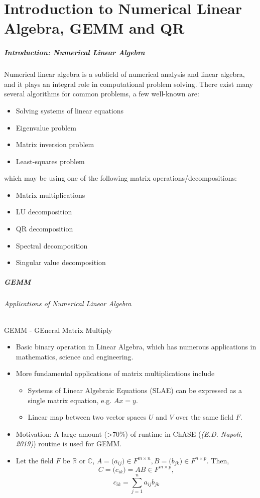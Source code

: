 \part{Introduction to Numerical Linear Algebra, GEMM and QR}
\makepart

\begin{frame}
\frametitle{Introduction: Numerical Linear Algebra}
Numerical linear algebra is a subfield of numerical analysis and linear algebra,
and it plays an integral role in computational problem solving.
There exist many several algorithms for common problems, a few well-known are:
\begin{itemize}
 \item Solving systems of linear equations
 \item Eigenvalue problem
 \item Matrix inversion problem
 \item Least-squares problem
\end{itemize}
which may be using one of the following matrix operations/decompositions:
\begin{itemize}
 \item Matrix multiplications
 \item LU decomposition
 \item QR decomposition
 \item Spectral decomposition
 \item Singular value decomposition
\end{itemize}
\end{frame}

\begin{frame}
\frametitle{GEMM}
\framesubtitle{Applications of Numerical Linear Algebra}
GEMM - GEneral Matrix Multiply
\begin{itemize}
 \item Basic binary operation in Linear Algebra, which has numerous applications in mathematics, science and engineering.
 \item More fundamental applications of matrix multiplications include
  \begin{itemize}
   \item Systems of Linear Algebraic Equations (SLAE) can be expressed as a single matrix equation, e.g. \(Ax = y\). 
   \item Linear map between two vector spaces \(U\) and \(V\) over the same field \(F\).
  \end{itemize}
 \item Motivation: A large amount (>70\%) of runtime in ChASE (\emph{(E.D. Napoli, 2019)}) routine is used for GEMM.
 \item Let the field \(F\) be \(\mathbb{R}\) or \(\mathbb{C}\), \(A =\big( a_{ij} \big) \in F^{m \times n}, B =\big( b_{jk} \big) \in F^{n \times p}\). Then,
 \begin{equation}
  C=\big( c_{ik} \big)=AB \in F^{m \times p},
 \end{equation}
 \begin{equation}
  c_{ik} = \sum_{j=1}^n{a_{ij}b_{jk}}
 \end{equation}
\end{itemize}
\end{frame}

